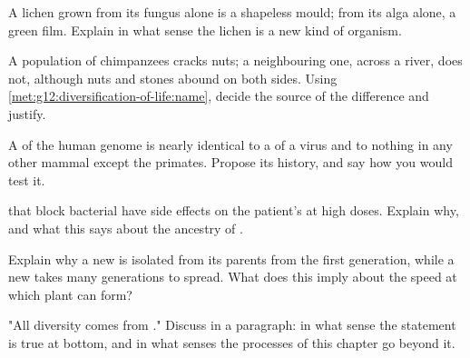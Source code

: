 \begin{exercise}[$\star\star$]\label{exo:g12:diversification-of-life:10}
A lichen grown from its fungus alone is a shapeless mould; from its
alga alone, a green film. Explain in what sense the lichen is a new
kind of organism.
\end{exercise}

\begin{exercise}[$\star\star$]\label{exo:g12:diversification-of-life:11}
A population of chimpanzees cracks nuts; a neighbouring one, across a
river, does not, although nuts and stones abound on both sides.
Using \cref{met:g12:diversification-of-life:name}, decide the source
of the difference and justify.
\end{exercise}

\begin{exercise}[$\star\star\star$]\label{exo:g12:diversification-of-life:12}
A  of the human genome is nearly identical to a  of a virus
and to nothing in any other mammal except the primates. Propose its
history, and say how you would test it.
\end{exercise}

\begin{exercise}[$\star\star\star$]\label{exo:g12:diversification-of-life:13}
 that block bacterial  have side effects on the
patient's  at high doses. Explain why, and what this says
about the ancestry of .
\end{exercise}

\begin{exercise}[$\star\star\star$]\label{exo:g12:diversification-of-life:14}
Explain why a new   is isolated from its parents from
the first generation, while a new  takes many generations to
spread. What does this imply about the speed at which plant 
can form?
\end{exercise}

\begin{exercise}[$\star\star\star$]\label{exo:g12:diversification-of-life:15}
"All diversity comes from ." Discuss in a paragraph: in what
sense the statement is true at bottom, and in what senses the
processes of this chapter go beyond it.
\end{exercise}

